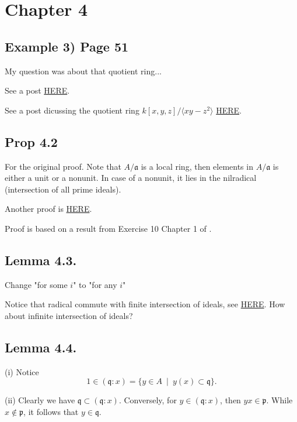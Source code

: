 \section{Chapter 4}

\subsection{Example 3) Page 51}

My question was about that quotient ring... 

See a post \href{https://math.stackexchange.com/questions/93478/is-each-power-of-a-prime-ideal-a-primary-ideal}{HERE}. 

See a post dicussing the quotient ring $k[x,y,z]/\langle xy-z^2\rangle$ \href{https://math.stackexchange.com/questions/3320367/mathbbcx-y-z-xy-z2-is-not-a-field}{HERE}. 

\subsection{Prop 4.2}

For the original proof. Note that $A/\mathfrak a$ is a local ring, then elements in $A/\mathfrak a$ is either a unit or a nonunit. In case of a nonunit, it lies in the nilradical (intersection of all prime ideals).

Another proof is \href{https://math.stackexchange.com/questions/649146/an-ideal-whose-radical-is-maximal-is-primary}{HERE}.

Proof is based on a result from Exercise 10 Chapter 1 of \cite{atiyah1994introduction}.

\subsection{Lemma 4.3.}

Change "for some $i$" to "for any $i$" 

Notice that radical commute with finite intersection of ideals, see \href{https://en.wikipedia.org/wiki/Radical_of_an_ideal}{HERE}. 
How about infinite intersection of ideals?

\subsection{Lemma 4.4.}

(i) Notice \[1\in (\mathfrak q:x)=\{y\in A ~\mid~ y(x)\subset \mathfrak q\}.\]

(ii) Clearly we have $\mathfrak q\subset (\mathfrak q:x)$.
Conversely, for $y\in (\mathfrak q:x)$, then $yx\in \mathfrak p$. While $x\notin \mathfrak p$, it follows that $y\in \mathfrak q$.